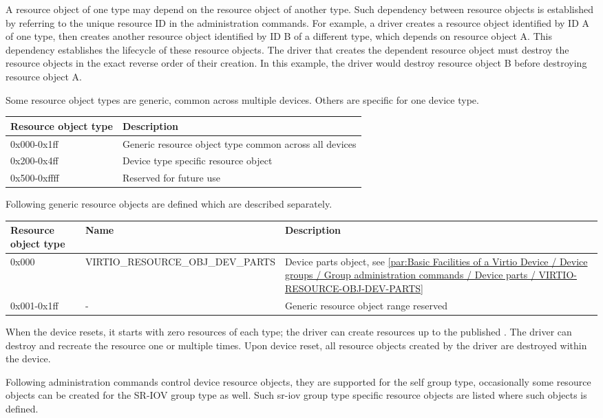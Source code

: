 A resource object of one type may depend on the resource object of another type.
Such dependency between resource objects is established by referring to the unique
resource ID in the administration commands. For example, a driver creates a
resource object identified by ID A of one type, then creates another resource
object identified by ID B of a different type, which depends on resource object
A. This dependency establishes the lifecycle of these resource objects. The driver
that creates the dependent resource object must destroy the resource objects in the
exact reverse order of their creation. In this example, the driver would
destroy resource object B before destroying resource object A.

Some resource object types are generic, common across multiple devices.
Others are specific for one device type.

\begin{tabular}{|l|l|}
\hline
Resource object type & Description \\
\hline \hline
0x000-0x1ff & Generic resource object type common across all devices \\
\hline
0x200-0x4ff & Device type specific resource object \\
\hline
0x500-0xffff & Reserved for future use  \\
\hline
\end{tabular}

Following generic resource objects are defined which are described separately.

\begin{tabularx}{\textwidth}{ |X||X|X| }
\hline
Resource object type & Name & Description \\
\hline \hline
0x000 & VIRTIO_RESOURCE_OBJ_DEV_PARTS & Device parts object, see \ref{par:Basic Facilities of a Virtio Device / Device groups / Group administration commands / Device parts / VIRTIO-RESOURCE-OBJ-DEV-PARTS} \\
\hline
0x001-0x1ff & - & Generic resource object range reserved \\
\hline
\hline
\end{tabularx}

When the device resets, it starts with zero resources of each type; the driver
can create resources up to the published . The driver can
destroy and recreate the resource one or multiple times. Upon device reset,
all resource objects created by the driver are destroyed within the device.

Following administration commands control device resource objects,
they are supported for the self group type, occasionally some resource
objects can be created for the SR-IOV group type as well. Such sr-iov group
type specific resource objects are listed where such objects is defined.

